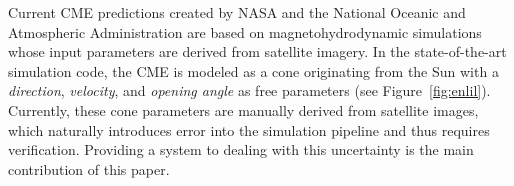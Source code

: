 \documentclass[journal]{vgtc}                %
\begin{document}
Current CME predictions created by NASA and the National Oceanic and Atmospheric Administration are based on magnetohydrodynamic simulations whose input parameters are derived from satellite imagery. In the state-of-the-art simulation code, the CME is modeled as a cone originating from the Sun with a \emph{direction}, \emph{velocity}, and \emph{opening angle} as free parameters (see Figure~\ref{fig:enlil}). Currently, these cone parameters are manually derived from satellite images, which naturally introduces error into the simulation pipeline and thus requires verification. Providing a system to dealing with this uncertainty is the main contribution of this paper.
\end{document}
